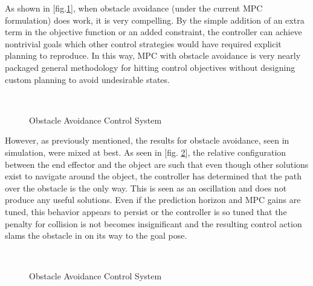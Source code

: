\documentclass[journal]{IEEEtran}
\begin{document}
As shown in [fig.\ref{fig:obs_avoid_path}], when obstacle avoidance (under the current MPC formulation) does work, it is very compelling. By the simple addition of an extra term in the objective function or an added constraint, the controller can achieve nontrivial goals which other control strategies would have required explicit planning to reproduce. In this way, MPC with obstacle avoidance is very nearly packaged general methodology for hitting control objectives without designing custom planning to avoid undesirable states. \\



\begin{figure}[ht]%
    \centering
    \qquad
    \\
    \qquad
    \caption{Obstacle Avoidance Control System}%
    \label{fig:obs_avoid_path}%
\end{figure}


However, as previously mentioned, the results for obstacle avoidance, seen in simulation, were mixed at best. As seen in [fig. \ref{fig:obs_avoid_path_bad}], the relative configuration between the end effector and the object are such that even though other solutions exist to navigate around the object, the controller has determined that the path over the obstacle is the only way. This is seen as an oscillation and does not produce any useful solutions. Even if the prediction horizon and MPC gains are tuned, this behavior appears to persist or the controller is so tuned that the penalty for collision is not becomes insignificant and the resulting control action slams the obstacle in on its way to the goal pose.

\begin{figure}[ht]%
    \centering
    \qquad
    \\
    \caption{Obstacle Avoidance Control System}%
    \label{fig:obs_avoid_path_bad}%
\end{figure}
\end{document}
